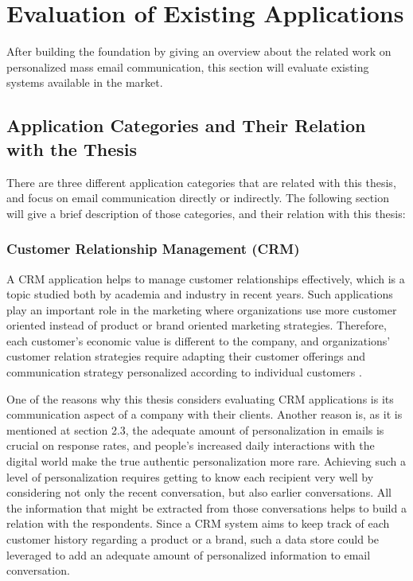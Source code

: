 \chapter{Evaluation of Existing Applications}
\label{chp:3:EvalExisAppl}
After building the foundation by giving an overview about the related work on personalized mass email communication, this section will evaluate existing systems available in the market. 

\section{Application Categories and Their Relation with the Thesis}
\label{sec:3.1:SystCate}

There are three different application categories that are related with this thesis, and focus on email communication directly or indirectly. The following section will give a brief description of those categories, and their relation with this thesis:

\subsection{Customer Relationship Management (CRM)}
\label{subsec:3.1.1:Cust}
A \ac{CRM} application helps to manage customer relationships effectively, which is a topic studied both by academia and industry in recent years. Such applications play an important role in the marketing where organizations use more customer oriented instead of product or brand oriented marketing strategies. Therefore, each customer's economic value is different to the company, and organizations' customer relation strategies require adapting their customer offerings and communication strategy personalized according to individual customers \citep{Reinartz2004}. 
\vspace{1cm}

One of the reasons why this thesis considers evaluating \ac{CRM} applications is its communication aspect of a company with their clients. Another reason is, as it is mentioned at section 2.3, the adequate amount of personalization in emails is crucial on response rates, and people's increased daily interactions with the digital world make the true authentic personalization more rare. Achieving such a level of personalization requires getting to know each recipient very well by considering not only the recent conversation, but also earlier conversations. All the information that might be extracted from those conversations helps to build a relation with the respondents. Since a \ac{CRM} system aims to keep track of each customer history regarding a product or a brand, such a data store could be leveraged to add an adequate amount of personalized information to email conversation. 

